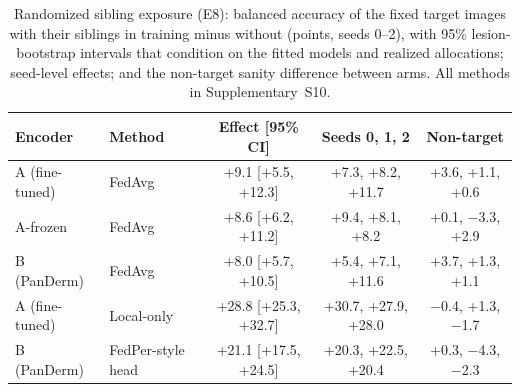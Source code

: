 \begin{table}[!t]
\centering
\caption{Randomized sibling exposure (E8): balanced accuracy of the fixed target images with their siblings in
training minus without (points, seeds 0--2), with 95\% lesion-bootstrap intervals that condition on the fitted
models and realized allocations; seed-level effects; and the non-target sanity difference between arms.
All methods in Supplementary~S10.}
\label{tab:exposure}
\setlength{\tabcolsep}{3pt}
\begin{tabular}{@{}llccc@{}}
\toprule
Encoder & Method & Effect [95\% CI] & Seeds 0, 1, 2 & Non-target \\
\midrule
A (fine-tuned) & FedAvg & +9.1 [+5.5, +12.3] & +7.3, +8.2, +11.7 & +3.6, +1.1, +0.6 \\
A-frozen & FedAvg & +8.6 [+6.2, +11.2] & +9.4, +8.1, +8.2 & +0.1, $-$3.3, +2.9 \\
B (PanDerm) & FedAvg & +8.0 [+5.7, +10.5] & +5.4, +7.1, +11.6 & +3.7, +1.3, +1.1 \\
A (fine-tuned) & Local-only & +28.8 [+25.3, +32.7] & +30.7, +27.9, +28.0 & $-$0.4, +1.3, $-$1.7 \\
B (PanDerm) & FedPer-style head & +21.1 [+17.5, +24.5] & +20.3, +22.5, +20.4 & +0.3, $-$4.3, $-$2.3 \\
\bottomrule
\end{tabular}
\end{table}
